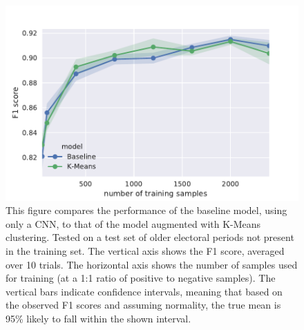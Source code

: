 \begin{figure}[tb]
  \centering
  \includegraphics[width=\textwidth]{figures/results/main_window4_oldtest/tseries_f1.pdf}
  \caption{This figure compares the performance of the baseline model, using
    only a CNN, to that of the model augmented with K-Means clustering.  Tested
    on a test set of older electoral periods not present in the training set.
    The vertical axis shows the F1 score, averaged over 10 trials. The
    horizontal axis shows the number of samples used for training (at a 1:1
    ratio of positive to negative samples). The vertical bars indicate
    confidence intervals, meaning that based on the observed F1 scores and
    assuming normality, the true mean is 95\% likely to fall within the shown
  interval.\label{fig:result_old}}
\end{figure}

